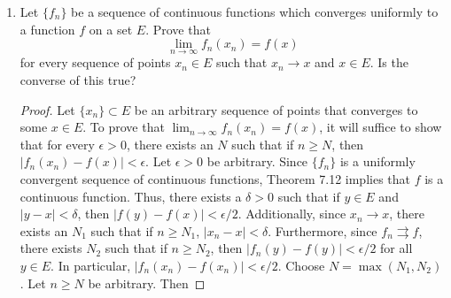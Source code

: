 \documentclass[../psets.tex]{subfiles}
\begin{document}
\begin{enumerate}[label={\textbf{\arabic*.}}]
\begin{equation*}
        I(x) =
        \begin{cases}
            0 & x\leq 0\\
            1 & x>0
        \end{cases}
    \end{equation*}
    if $\{x_n\}$ is a sequence of distinct points of $(a,b)$, and if $\sum|c_n|$ converges, prove that the series
    \begin{equation*}
        f(x) = \sum_{n=1}^\infty c_nI(x-x_n)
    \end{equation*}
    converges uniformly on $[a,b]$, and that $f$ is continuous for every $x\neq x_n$.
    \begin{proof}
        Let $f_n(x)=c_nI(x-x_n)$ for all $n\in\N$. To prove that $f$ converges uniformly on $[a,b]$, Theorem 7.10 tells us that it will suffice to show that $|f_n(x)|\leq M_n$ for all $x\in[a,b]$ and $\sum M_n$ converges. Let $M_n=c_n$ for all $n\in\N$. Then for any $x\in[a,b]$,
        \begin{equation*}
            |f_n(x)| = c_nI(x-x_n) \leq c_n = M_n
        \end{equation*}
        as desired. Additionally, $\sum M_n=\sum c_n$ converges, as desired. This completes the proof.\par
        For the second part of the proof, let $x\notin\{x_n\}$. Then every $f_n$ is continuous at $x$ by definition. Thus, $f$ is a uniformly convergent sequence of functions continuous at $x$, so by Theorem 7.12, $f$ is continuous at $x$.
    \end{proof}
    \item Let $\{f_n\}$ be a sequence of continuous functions which converges uniformly to a function $f$ on a set $E$. Prove that
    \begin{equation*}
        \lim_{n\to\infty}f_n(x_n) = f(x)
    \end{equation*}
    for every sequence of points $x_n\in E$ such that $x_n\to x$ and $x\in E$. Is the converse of this true?
    \begin{proof}
        Let $\{x_n\}\subset E$ be an arbitrary sequence of points that converges to some $x\in E$. To prove that $\lim_{n\to\infty}f_n(x_n)=f(x)$, it will suffice to show that for every $\epsilon>0$, there exists an $N$ such that if $n\geq N$, then $|f_n(x_n)-f(x)|<\epsilon$. Let $\epsilon>0$ be arbitrary. Since $\{f_n\}$ is a uniformly convergent sequence of continuous functions, Theorem 7.12 implies that $f$ is a continuous function. Thus, there exists a $\delta>0$ such that if $y\in E$ and $|y-x|<\delta$, then $|f(y)-f(x)|<\epsilon/2$. Additionally, since $x_n\to x$, there exists an $N_1$ such that if $n\geq N_1$, $|x_n-x|<\delta$. Furthermore, since $f_n\rightrightarrows f$, there exists $N_2$ such that if $n\geq N_2$, then $|f_n(y)-f(y)|<\epsilon/2$ for all $y\in E$. In particular, $|f_n(x_n)-f(x_n)|<\epsilon/2$. Choose $N=\max(N_1,N_2)$. Let $n\geq N$ be arbitrary. Then

\end{proof}
\end{enumerate}
\end{document}
